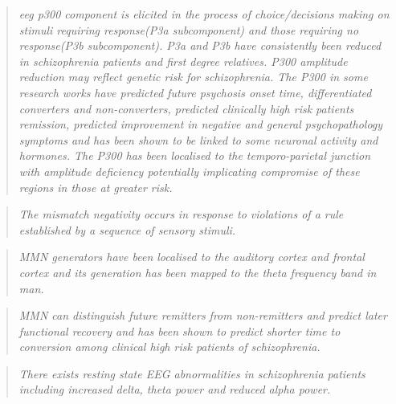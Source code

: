 \begin{quotation}
	\textit{\ac{eeg} \ac{p300} component is elicited in the process of choice/decisions making on stimuli requiring response(P3a subcomponent) and those requiring no response(P3b subcomponent). P3a and P3b have consistently been reduced in schizophrenia patients and first degree relatives. P300 amplitude reduction may reflect genetic risk for schizophrenia. The P300 in some research works have predicted future psychosis onset time, differentiated converters and non-converters, predicted clinically high risk patients remission, predicted improvement in negative and general psychopathology symptoms and has been shown to be linked to some neuronal activity and hormones. The P300 has been localised to the temporo-parietal junction with amplitude deficiency potentially implicating compromise of these regions in those at greater risk.}
	\begin{flushright}
		\cite{hamilton2020electroencephalography}
	\end{flushright}
\end{quotation}
\begin{quotation}
	\textit{The mismatch negativity occurs in response to violations of a rule established by a sequence of sensory stimuli.}
	\begin{flushright}
		\cite{etiologySZ}
	\end{flushright}
\end{quotation}
\begin{quotation}
	\textit{MMN generators have been localised to the auditory cortex and frontal cortex and its generation  has been mapped to the theta frequency band in man.}
	\begin{flushright}
		\cite{alho1995cerebral}
	\end{flushright}
\end{quotation}
\begin{quotation}
	\textit{MMN can distinguish future remitters from non-remitters and predict later functional recovery and has been shown to predict shorter time to conversion among clinical high risk patients of schizophrenia.}
	\begin{flushright}
		\cite{hamilton2020electroencephalography}
	\end{flushright}
\end{quotation}
\begin{quotation}
	\textit{There exists resting state EEG abnormalities in schizophrenia patients including increased delta, theta power and reduced alpha power.}
	\begin{flushright}
		\cite{boutros2008status}
	\end{flushright}
\end{quotation}
